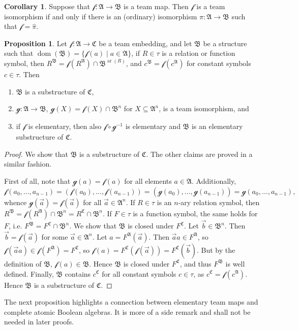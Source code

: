 \documentclass[a4paper]{amsart}
\theoremstyle{definition}
\newtheorem{proposition}[definition]{Proposition}
\newtheorem{corollary}[definition]{Corollary}
\theoremstyle{remark}
\newcommand{\A}{\mathcal{A}}
\newcommand{\B}{\mathcal{B}}
\newcommand{\C}{\mathcal{C}}
\DeclareMathOperator{\dom}{dom}
\DeclareMathOperator{\ar}{ar}
\theoremstyle{definition}
\renewcommand{\A}{\mathfrak{A}}
\renewcommand{\B}{\mathfrak{B}}
\renewcommand{\C}{\mathfrak{C}}
\newcommand{\f}{\mathcal{f}}
\newcommand{\g}{\mathcal{g}}
\begin{document}
\begin{corollary}
    Suppose that $\f\colon\A\to\B$ is a team map. Then $\f$ is a team isomorphism if and only if there is an (ordinary) isomorphism $\pi\colon\A\to\B$ such that $\f = \hat\pi$.
\end{corollary}



\begin{proposition}\label{From team embedding to a substructure}
    Let $\f\colon\A\to\C$ be a team embedding, and let $\B$ be a structure such that $\dom(\B) = \{\f(a) \mid a\in\A\}$, if $R\in\tau$ is a relation or function symbol, then $R^\B = \f(R^\A)\cap\B^{\ar(R)}$, and $c^\B = \f(c^\A)$ for constant symbols $c\in\tau$. Then
    \begin{enumerate}
        \item $\B$ is a substructure of $\C$,
        \item $\g\colon\A\to\B$, $\g(X) = \f(X)\cap\B^n$ for $X\subseteq\A^n$, is a team isomorphism, and
        \item if $\f$ is elementary, then also $\f\circ\g^{-1}$ is elementary and $\B$ is an elementary substructure of $\C$.
    \end{enumerate}
\end{proposition}
\begin{proof}
    We show that $\B$ is a substructure of $\C$. The other claims are proved in a similar fashion.

    First of all, note that $\g(a) = \f(a)$ for all elements $a\in\A$. Additionally,
    \[
        \f(a_0,\dots,a_{n-1}) = (\f(a_0),\dots,\f(a_{n-1})) = (\g(a_0),\dots,\g(a_{n-1})) = \g(a_0,\dots,a_{n-1}),
    \]
    whence $\g(\vec a) = \f(\vec a)$ for all $\vec a\in\A^n$.
    If $R\in\tau$ is an $n$-ary relation symbol, then $R^\B = \f(R^\A)\cap\B^n = R^\C\cap\B^n$. If $F\in\tau$ is a function symbol, the same holds for $F$, i.e. $F^\B = F^\C\cap\B^n$. We show that $\B$ is closed under $F^\C$. Let $\vec b \in\B^n$. Then $\vec b = \f(\vec a)$ for some $\vec a\in\A^n$. Let $a = F^\A(\vec a)$. Then $\vec aa\in F^\A$, so $\f(\vec aa)\in \f(F^\A) = F^\C$, so $\f(a) = F^\C(\f(\vec a)) = F^\C(\vec b)$. But by the definition of $\B$, $\f(a)\in\B$. Hence $\B$ is closed under $F^\C$, and thus $F^\B$ is well defined. Finally, $\B$ contains $c^\C$ for all constant symbols $c\in\tau$, as $c^\C = \f(c^\A)$. Hence $\B$ is a substructure of $\C$.
\end{proof}


The next proposition highlights a connection between elementary team maps and complete atomic Boolean algebras. It is more of a side remark and shall not be needed in later proofs.
\end{document}
